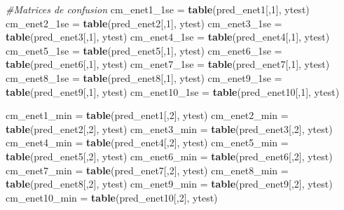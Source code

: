 \documentclass[
]{article}
\newenvironment{Shaded}{\begin{snugshade}}{\end{snugshade}}
\newcommand{\CommentTok}[1]{\textcolor[rgb]{0.56,0.35,0.01}{\textit{#1}}}
\newcommand{\DecValTok}[1]{\textcolor[rgb]{0.00,0.00,0.81}{#1}}
\newcommand{\KeywordTok}[1]{\textcolor[rgb]{0.13,0.29,0.53}{\textbf{#1}}}
\newcommand{\NormalTok}[1]{#1}
\newcommand{\StringTok}[1]{\textcolor[rgb]{0.31,0.60,0.02}{#1}}
\begin{document}
\begin{Shaded}
\begin{Highlighting}[]
\CommentTok{#Matrices de confusion}
\NormalTok{cm_enet1_1se =}\StringTok{ }\KeywordTok{table}\NormalTok{(pred_enet1[,}\DecValTok{1}\NormalTok{], ytest)}
\NormalTok{cm_enet2_1se =}\StringTok{ }\KeywordTok{table}\NormalTok{(pred_enet2[,}\DecValTok{1}\NormalTok{], ytest)}
\NormalTok{cm_enet3_1se =}\StringTok{ }\KeywordTok{table}\NormalTok{(pred_enet3[,}\DecValTok{1}\NormalTok{], ytest)}
\NormalTok{cm_enet4_1se =}\StringTok{ }\KeywordTok{table}\NormalTok{(pred_enet4[,}\DecValTok{1}\NormalTok{], ytest)}
\NormalTok{cm_enet5_1se =}\StringTok{ }\KeywordTok{table}\NormalTok{(pred_enet5[,}\DecValTok{1}\NormalTok{], ytest)}
\NormalTok{cm_enet6_1se =}\StringTok{ }\KeywordTok{table}\NormalTok{(pred_enet6[,}\DecValTok{1}\NormalTok{], ytest)}
\NormalTok{cm_enet7_1se =}\StringTok{ }\KeywordTok{table}\NormalTok{(pred_enet7[,}\DecValTok{1}\NormalTok{], ytest)}
\NormalTok{cm_enet8_1se =}\StringTok{ }\KeywordTok{table}\NormalTok{(pred_enet8[,}\DecValTok{1}\NormalTok{], ytest)}
\NormalTok{cm_enet9_1se =}\StringTok{ }\KeywordTok{table}\NormalTok{(pred_enet9[,}\DecValTok{1}\NormalTok{], ytest)}
\NormalTok{cm_enet10_1se =}\StringTok{ }\KeywordTok{table}\NormalTok{(pred_enet10[,}\DecValTok{1}\NormalTok{], ytest)}

\NormalTok{cm_enet1_min =}\StringTok{ }\KeywordTok{table}\NormalTok{(pred_enet1[,}\DecValTok{2}\NormalTok{], ytest)}
\NormalTok{cm_enet2_min =}\StringTok{ }\KeywordTok{table}\NormalTok{(pred_enet2[,}\DecValTok{2}\NormalTok{], ytest)}
\NormalTok{cm_enet3_min =}\StringTok{ }\KeywordTok{table}\NormalTok{(pred_enet3[,}\DecValTok{2}\NormalTok{], ytest)}
\NormalTok{cm_enet4_min =}\StringTok{ }\KeywordTok{table}\NormalTok{(pred_enet4[,}\DecValTok{2}\NormalTok{], ytest)}
\NormalTok{cm_enet5_min =}\StringTok{ }\KeywordTok{table}\NormalTok{(pred_enet5[,}\DecValTok{2}\NormalTok{], ytest)}
\NormalTok{cm_enet6_min =}\StringTok{ }\KeywordTok{table}\NormalTok{(pred_enet6[,}\DecValTok{2}\NormalTok{], ytest)}
\NormalTok{cm_enet7_min =}\StringTok{ }\KeywordTok{table}\NormalTok{(pred_enet7[,}\DecValTok{2}\NormalTok{], ytest)}
\NormalTok{cm_enet8_min =}\StringTok{ }\KeywordTok{table}\NormalTok{(pred_enet8[,}\DecValTok{2}\NormalTok{], ytest)}
\NormalTok{cm_enet9_min =}\StringTok{ }\KeywordTok{table}\NormalTok{(pred_enet9[,}\DecValTok{2}\NormalTok{], ytest)}
\NormalTok{cm_enet10_min =}\StringTok{ }\KeywordTok{table}\NormalTok{(pred_enet10[,}\DecValTok{2}\NormalTok{], ytest)}
\end{Highlighting}
\end{Shaded}
\end{document}
